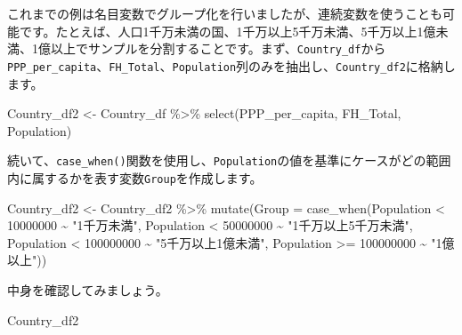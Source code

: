 \documentclass[
  a4paper,
  pandoc,
  ja=standard,
  jafont=haranoaji]{bxjsbook}
\newenvironment{Shaded}{\begin{snugshade}}{\end{snugshade}}
\newcommand{\AttributeTok}[1]{\textcolor[rgb]{0.00,0.48,0.65}{#1}}
\newcommand{\DecValTok}[1]{\textcolor[rgb]{0.68,0.00,0.00}{#1}}
\newcommand{\FunctionTok}[1]{\textcolor[rgb]{0.28,0.35,0.67}{#1}}
\newcommand{\NormalTok}[1]{\textcolor[rgb]{0.00,0.48,0.65}{#1}}
\newcommand{\OtherTok}[1]{\textcolor[rgb]{0.00,0.48,0.65}{#1}}
\newcommand{\SpecialCharTok}[1]{\textcolor[rgb]{0.37,0.37,0.37}{#1}}
\newcommand{\StringTok}[1]{\textcolor[rgb]{0.13,0.47,0.30}{#1}}
\begin{document}
これまでの例は名目変数でグループ化を行いましたが、連続変数を使うことも可能です。たとえば、人口1千万未満の国、1千万以上5千万未満、5千万以上1億未満、1億以上でサンプルを分割することです。まず、\texttt{Country\_df}から\texttt{PPP\_per\_capita}、\texttt{FH\_Total}、\texttt{Population}列のみを抽出し、\texttt{Country\_df2}に格納します。

\begin{Shaded}
\begin{Highlighting}[numbers=left,,]
\NormalTok{Country\_df2 }\OtherTok{\textless{}{-}}\NormalTok{ Country\_df }\SpecialCharTok{\%\textgreater{}\%}
  \FunctionTok{select}\NormalTok{(PPP\_per\_capita, FH\_Total, Population)}
\end{Highlighting}
\end{Shaded}

続いて、\texttt{case\_when()}関数を使用し、\texttt{Population}の値を基準にケースがどの範囲内に属するかを表す変数\texttt{Group}を作成します。

\begin{Shaded}
\begin{Highlighting}[numbers=left,,]
\NormalTok{Country\_df2 }\OtherTok{\textless{}{-}}\NormalTok{ Country\_df2 }\SpecialCharTok{\%\textgreater{}\%}
  \FunctionTok{mutate}\NormalTok{(}\AttributeTok{Group =} \FunctionTok{case\_when}\NormalTok{(Population }\SpecialCharTok{\textless{}}  \DecValTok{10000000}  \SpecialCharTok{\textasciitilde{}} \StringTok{"1千万未満"}\NormalTok{,}
\NormalTok{                           Population }\SpecialCharTok{\textless{}}  \DecValTok{50000000}  \SpecialCharTok{\textasciitilde{}} \StringTok{"1千万以上5千万未満"}\NormalTok{,}
\NormalTok{                           Population }\SpecialCharTok{\textless{}}  \DecValTok{100000000} \SpecialCharTok{\textasciitilde{}} \StringTok{"5千万以上1億未満"}\NormalTok{,}
\NormalTok{                           Population }\SpecialCharTok{\textgreater{}=} \DecValTok{100000000} \SpecialCharTok{\textasciitilde{}} \StringTok{"1億以上"}\NormalTok{))}
\end{Highlighting}
\end{Shaded}

中身を確認してみましょう。

\begin{Shaded}
\begin{Highlighting}[numbers=left,,]
\NormalTok{Country\_df2}
\end{Highlighting}
\end{Shaded}
\end{document}
